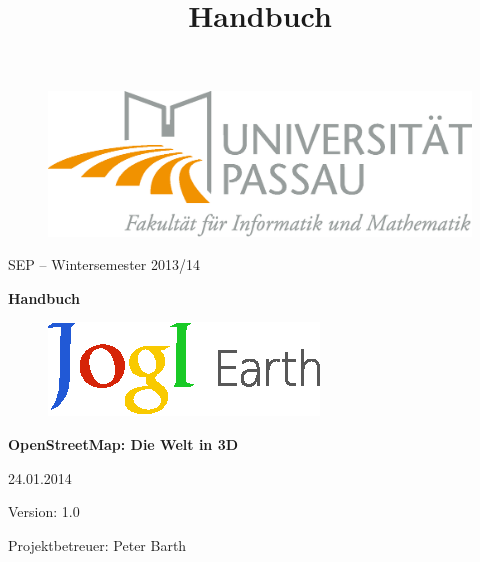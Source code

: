 \documentclass[10pt]{scrreprt}
\begin{document}
\thispagestyle{empty}
\sffamily
 
\title{Handbuch}

\begin{figure}
\begin{flushright}
	\includegraphics[scale=0.4]{uniLogo.eps}
\vspace{2.0 cm}
\end{flushright}
\end{figure}

\begin{center}
\vspace{2.0 cm}
{\LARGE SEP – Wintersemester 2013/14}

\vspace{1.0 cm}
\textbf{{\Huge Handbuch}}

\vspace{0.4 cm}
\begin{figure}[!htb]
\begin{center}
	\includegraphics[scale=1.5]{Logo-Print.eps}
\end{center}
\end{figure}

\vspace{0.2 cm}
\textbf{{\huge OpenStreetMap: Die Welt in 3D}}

\vspace{1.5 cm}
24.01.2014

\vspace{0.5 cm}
Version: 1.0

\vspace{1.5 cm}
{\Large Projektbetreuer: Peter Barth}

\end{center}


\pagebreak
\rmfamily
\tableofcontents
\end{document}
